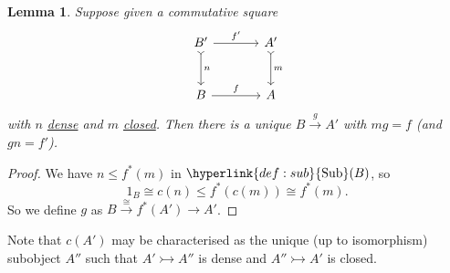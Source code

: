 \documentclass{article}
\DeclareMathOperator{\Sub}{Sub}
\newtheorem{nlemma}[nthm]{Lemma}
\begin{document}
\begin{nlemma}\label{lem:7.17}
  Suppose given a commutative square
  \begin{equation*}
    \begin{tikzcd}[sep=large]
    B' \rar{f'} \dar[tail]{n} & A' \dar[tail]{m}\\
    B \rar{f} & A
  \end{tikzcd}
  \end{equation*}
  with $n$ \hyperlink{def:denseclosed}{dense} and $m$ \hyperlink{def:denseclosed}{closed}.
  Then there is a unique $B \xrightarrow{g} A'$ with $mg = f$ (and $gn=f'$).
\end{nlemma}
\begin{proof}
  We have $n \leq f^*(m)$ in $\hyperlink{def:sub}{\Sub}(B)$, so
  \begin{equation*}1_B \cong c(n) \leq f^*(c(m)) \cong f^*(m).\end{equation*}
  So we define $g$ as $B \xrightarrow{\cong} f^*(A') \to A'$.
\end{proof}

Note that $c(A')$ may be characterised as the unique (up to isomorphism) subobject $A''$ such that $A' \rightarrowtail A''$ is dense and $A'' \rightarrowtail A'$ is closed.
\end{document}
